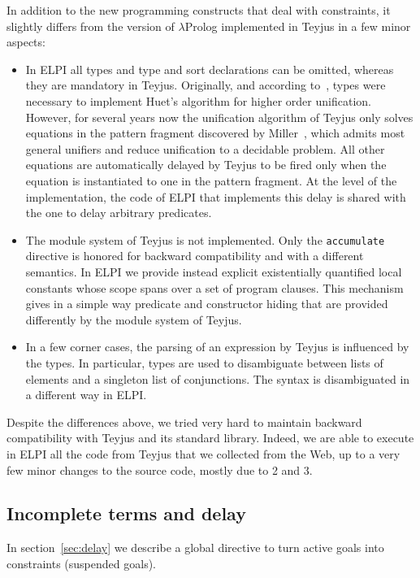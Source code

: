 \documentclass{easychair}
\begin{document}
In addition to the new programming constructs that deal with constraints, it
slightly differs from the version of $\lambda$Prolog implemented in Teyjus in a
few minor aspects:
\begin{itemize}
\item In ELPI all types and type and sort declarations can be omitted, whereas
	they are mandatory in Teyjus. Originally, and according
	to~\cite{jlp98}, types were necessary to implement Huet's algorithm for
	higher order unification. However, for several years now the
	unification algorithm of Teyjus only solves equations in the pattern
	fragment discovered by Miller~\cite{patternfrag}, which admits most
	general unifiers and reduce unification to a decidable problem. All
	other equations are automatically delayed by Teyjus to be fired only
	when the equation is instantiated to one in the pattern fragment. At
	the level of the implementation, the code of ELPI that implements this
	delay is shared with the one to delay arbitrary predicates.
\item The module system of Teyjus is not implemented. Only the
	\verb+accumulate+ directive is honored for backward compatibility and
	with a different semantics. In ELPI we provide instead explicit
	existentially quantified local constants whose scope spans over a set
	of program clauses. This mechanism gives in a simple way predicate and
	constructor hiding that are provided differently by the module system
	of Teyjus.
\item In a few corner cases, the parsing of an expression by Teyjus is
	influenced by the types. In particular, types are used to disambiguate
	between lists of elements and a singleton list of conjunctions. The
	syntax is disambiguated in a different way in ELPI.
\end{itemize}

Despite the differences above, we tried very hard to maintain backward
compatibility with Teyjus and its standard library. Indeed, we are able to
execute in ELPI all the code from Teyjus that we collected from the Web, up to
a very few minor changes to the source code, mostly due to 2 and 3.

\subsection{Incomplete terms and delay} %

In section~\ref{sec:delay} we describe a global directive to
turn active goals into constraints (suspended goals).
\end{document}
